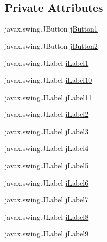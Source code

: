 \subsection*{Private Attributes}
\begin{DoxyCompactItemize}
\item 
javax.\+swing.\+J\+Button \mbox{\hyperlink{class_interfaz_package_1_1_verificar_lector_a104af7dfee375e893832d6c38d12a1dd}{j\+Button1}}
\item 
javax.\+swing.\+J\+Button \mbox{\hyperlink{class_interfaz_package_1_1_verificar_lector_a05b1ef2e05306def8a78c0e4ee0802fb}{j\+Button2}}
\item 
javax.\+swing.\+J\+Label \mbox{\hyperlink{class_interfaz_package_1_1_verificar_lector_a94dfc256ea6a29f49c233c3fec52ac7d}{j\+Label1}}
\item 
javax.\+swing.\+J\+Label \mbox{\hyperlink{class_interfaz_package_1_1_verificar_lector_aa900aa48aa55e9851fd9085b6303d8af}{j\+Label10}}
\item 
javax.\+swing.\+J\+Label \mbox{\hyperlink{class_interfaz_package_1_1_verificar_lector_ae75078bb58455233a13a76d47cca166b}{j\+Label11}}
\item 
javax.\+swing.\+J\+Label \mbox{\hyperlink{class_interfaz_package_1_1_verificar_lector_afe825b210747901c7fe1977911da0ae4}{j\+Label2}}
\item 
javax.\+swing.\+J\+Label \mbox{\hyperlink{class_interfaz_package_1_1_verificar_lector_ad3a983dda4f171c69b407375acaf226d}{j\+Label3}}
\item 
javax.\+swing.\+J\+Label \mbox{\hyperlink{class_interfaz_package_1_1_verificar_lector_a62bbde18899ef9256baedfe4b9356420}{j\+Label4}}
\item 
javax.\+swing.\+J\+Label \mbox{\hyperlink{class_interfaz_package_1_1_verificar_lector_a1023d3021f65695047c7e5bc41613e09}{j\+Label5}}
\item 
javax.\+swing.\+J\+Label \mbox{\hyperlink{class_interfaz_package_1_1_verificar_lector_a6f0c74ae426505ab6ed81776821a97ee}{j\+Label6}}
\item 
javax.\+swing.\+J\+Label \mbox{\hyperlink{class_interfaz_package_1_1_verificar_lector_abffae3dbc14e8cf54a27d75cbd7cb040}{j\+Label7}}
\item 
javax.\+swing.\+J\+Label \mbox{\hyperlink{class_interfaz_package_1_1_verificar_lector_a52d146b88c9bbed0098e87f7e4f3a759}{j\+Label8}}
\item 
javax.\+swing.\+J\+Label \mbox{\hyperlink{class_interfaz_package_1_1_verificar_lector_a6b89cc82be1dfb55e197733ceb9f8455}{j\+Label9}}

\end{DoxyCompactItemize}
